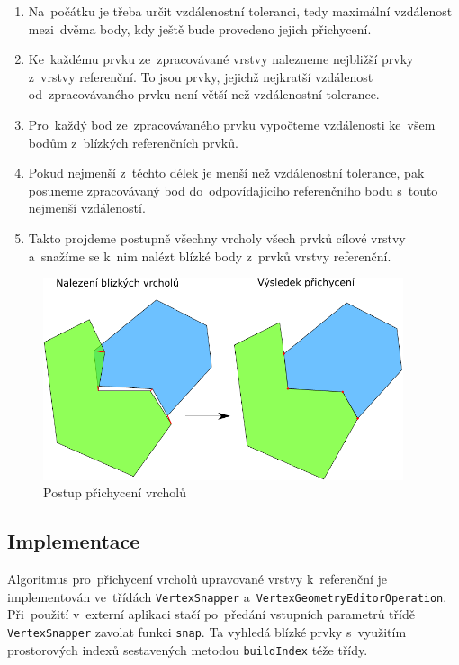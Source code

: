 \begin{enumerate}
 \item Na~počátku je třeba určit vzdálenostní toleranci, tedy maximální 
    vzdálenost mezi~dvěma body, kdy ještě bude provedeno jejich přichycení.
 \item Ke~každému prvku ze~zpracovávané vrstvy nalezneme nejbližší prvky 
    z~vrstvy referenční. To jsou prvky, jejichž nejkratší vzdálenost 
    od~zpracovávaného prvku není větší	než vzdálenostní tolerance.
 \item Pro~každý bod ze~zpracovávaného prvku vypočteme vzdálenosti ke~všem
    bodům z~blízkých referenčních prvků.
 \item Pokud nejmenší z~těchto délek je menší než vzdálenostní tolerance, 
    pak posuneme zpracovávaný bod do~odpovídajícího referenčního bodu s~touto
    nejmenší vzdáleností.
 \item Takto projdeme postupně všechny vrcholy všech prvků cílové vrstvy 
    a~snažíme se k~nim nalézt blízké body z~prvků vrstvy referenční. 
\end{enumerate}

\label{vspic}
  \begin{figure}[hbt]
    \centering
      \includegraphics[width=300pt]{./pictures/vs-princip.pdf}
      \caption{Postup přichycení vrcholů}
      \label{fig:vs-princip}
  \end{figure}

\subsection{Implementace} %
\label{vs-implementace}
Algoritmus pro~přichycení vrcholů upravované vrstvy k~referenční je 
implementován ve~třídách \texttt{Vertex\-Snapper} 
a~\texttt{Vertex\-Geometry\-Editor\-Operation}. Při~použití v~externí aplikaci 
stačí po~předání vstupních parametrů třídě \texttt{Vertex\-Snapper} zavolat 
funkci \texttt{snap}. Ta vyhledá blízké prvky s~využitím prostorových 
indexů sestavených metodou \texttt{build\-Index} téže třídy.

